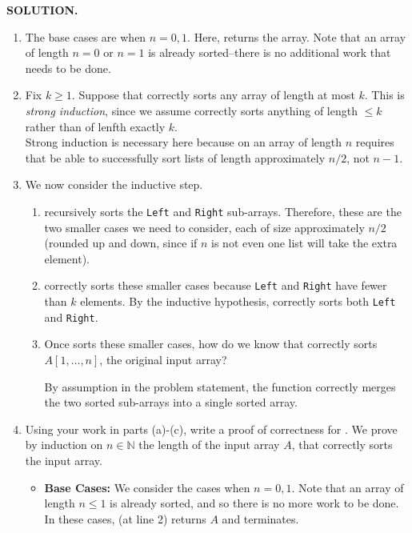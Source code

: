 \documentclass[11pt]{article}
\begin{document}
\begin{framed}
\noindent\textbf{SOLUTION.}

\begin{enumerate}
	\item The base cases are when $n = 0, 1$. Here,  returns the array. Note that an array of length $n = 0$ or $n = 1$ is already sorted--there is no additional work that needs to be done.

	\item Fix $k \geq 1$. Suppose that  correctly sorts any array of length at most $k$. This is \emph{strong induction}, since we assume  correctly sorts anything of length $\leq k$ rather than of lenfth exactly $k$. \\

	Strong induction is necessary here because  on an array of length $n$ requires that  be able to successfully sort lists of length approximately $n/2$, not $n-1$.

	\item We now consider the inductive step.
	\begin{enumerate}[label=\roman*.]
		\item {} recursively sorts the \texttt{Left} and \texttt{Right} sub-arrays. Therefore, these are the two smaller cases we need to consider, each of size approximately $n/2$ (rounded up and down, since if $n$ is not even one list will take the extra element).


		\item {} correctly sorts these smaller cases because \texttt{Left} and \texttt{Right} have fewer than $k$ elements. By the inductive hypothesis,  correctly sorts both \texttt{Left} and \texttt{Right}.

		\item Once  sorts these smaller cases, how do we know that  correctly sorts $A[1, \ldots, n]$, the original input array?

			By assumption in the problem statement, the  function correctly merges the two sorted sub-arrays into a single sorted array.
	\end{enumerate}
	\item Using your work in parts (a)-(c), write a proof of correctness for .
	We prove by induction on $n \in \mathbb{N}$ the length of the input array $A$, that  correctly sorts the input array.
	\begin{itemize}[label=]
		\item \textbf{Base Cases:} We consider the cases when $n = 0, 1$. Note that an array of length $n \leq 1$ is already sorted, and so there is no more work to be done. In these cases,  (at line 2) returns $A$ and terminates.


\end{itemize}
\end{enumerate}
\end{framed}
\end{document}
